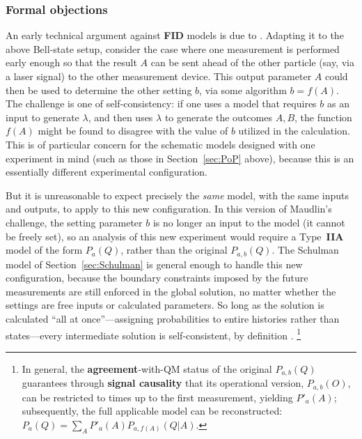 \documentclass[onecolumn, nofootinbib, 12pt]{revtex4-1}
\begin{document}
\subsubsection{Formal objections}

An early technical argument against {\bf FID} models is due to \textcite{maudlin1994}.  Adapting it to the above Bell-state setup, consider the case where one measurement is performed early enough so that the result $A$ can be sent ahead of the other particle (say, via a laser signal) to the other measurement device.  This output parameter $A$ could then be used to determine the other setting $b$, via some algorithm $b=f(A)$.  The challenge is one of self-consistency: if one uses a model that requires $b$ as an input to generate $\lambda$, and then uses $\lambda$ to generate the outcomes $A,B$, the function $f(A)$ might be found to disagree with the value of $b$ utilized in the calculation.  This is of particular concern for the schematic models designed with one experiment in mind (such as those in Section~\ref{sec:PoP} above), because this is an essentially different experimental configuration.

But it is unreasonable to expect precisely the \emph{same} model, with the same inputs and outputs, to apply to this new configuration.  In this version of Maudlin's challenge, the setting parameter $b$ is no longer an input to the model (it cannot be freely set), so an analysis of this new experiment would require a Type~{\bf IIA} model of the form $P_a(Q)$, rather than the original $P_{a,b}(Q)$.  The Schulman model of Section~\ref{sec:Schulman} is general enough to handle this new configuration, because the boundary constraints imposed by the future measurements are still enforced in the global solution, no matter whether the settings are free inputs or calculated parameters.  So long as the solution is calculated ``all at once''---assigning probabilities to entire histories rather than states---every intermediate solution is self-consistent, by definition \cite{berkovitz2008,lewis2013,wharton2014}.%
\footnote{In general, the {\bf agreement}-with-QM status of the original $P_{a,b}(Q)$ guarantees through {\bf signal causality} that its operational version, $P_{a,b}(O)$, can be restricted to times up to the first measurement, yielding $P'_a(A)$; subsequently, the full applicable model can be reconstructed: $P_a(Q) = \sum_A P'_a(A) P_{a,f(A)}(Q|A)$.}
\end{document}

